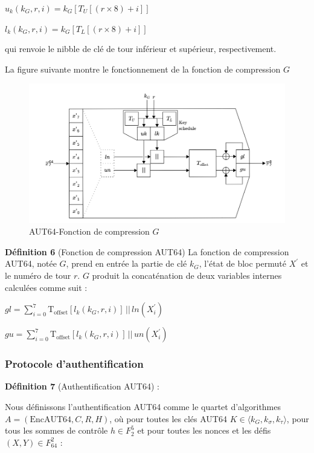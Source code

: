 \documentclass{template}
\begin{document}
$u_k(k_G, r, i) = k_G[\text{$T_U$}[(r \times 8) + i]]$

 
$l_k(k_G, r, i) = k_G[\text{$T_L$}[(r \times 8) + i]]$

 qui renvoie le nibble de clé de tour inférieur et supérieur, respectivement.

 La figure suivante montre le fonctionnement de la fonction de compression $G$

 \begin{figure}
    \centering
    \includegraphics[width=\textwidth]{Compression.PNG}
    \caption{AUT64-Fonction de compression $G$}
    \label{fig:image}
\end{figure}


\textbf{Définition 6}  (Fonction de compression AUT64) La fonction de compression AUT64, notée $G$, prend en entrée la partie de clé $k_G$, l'état de bloc permuté $X^{'}$ et le numéro de tour $r$. $G$ produit la concaténation de deux variables internes calculées comme suit :


$gl = \sum_{i=0}^{7} \text{T}_{\text{offset}}[l_k(k_G, r, i)] \, || \, ln(X_i^{'})$

$gu = \sum_{i=0}^{7} \text{T}_{\text{offset}}[l_k(k_G, r, i)] \, || \, un(X_i^{'})$

\subsubsection{Protocole d'authentification}
\baselineskip=16pt
\textbf{Définition 7} (Authentification AUT64) :

Nous définissons l'authentification AUT64 comme le quartet d'algorithmes $A = (\text{EncAUT64}, C, R, H)$, où pour toutes les clés AUT64 $K \in \langle k_G, k_\sigma, k_\tau \rangle$, pour tous les sommes de contrôle $h \in F_2^{5}$ et pour toutes les nonces et les défis $(X, Y) \in F_{64}^2$ :
\end{document}

